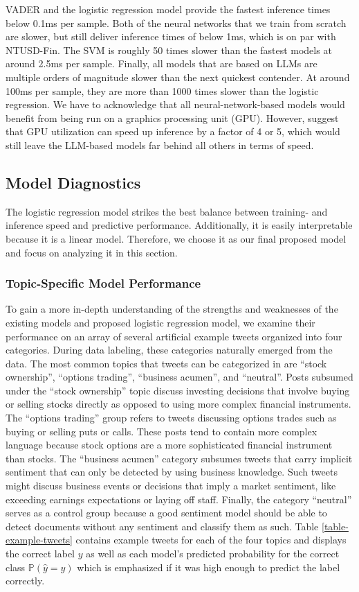 VADER and the logistic regression model provide the fastest inference times below 0.1ms per sample. Both of the neural networks that we train from scratch are slower, but still deliver inference times of below 1ms, which is on par with NTUSD-Fin. The SVM is roughly 50 times slower than the fastest models at around 2.5ms per sample. Finally, all models that are based on LLMs are multiple orders of magnitude slower than the next quickest contender. At around 100ms per sample, they are more than 1000 times slower than the logistic regression. We have to acknowledge that all neural-network-based models would benefit from being run on a graphics processing unit (GPU). However,  suggest that GPU utilization can speed up inference by a factor of 4 or 5, which would still leave the LLM-based models far behind all others in terms of speed.

\subsection{Model Diagnostics}
The logistic regression model strikes the best balance between training- and inference speed and predictive performance. Additionally, it is easily interpretable because it is a linear model. Therefore, we choose it as our final proposed model and focus on analyzing it in this section.

\subsubsection{Topic-Specific Model Performance}
To gain a more in-depth understanding of the strengths and weaknesses of the existing models and proposed logistic regression model, we examine their performance on an array of several artificial example tweets organized into four categories. During data labeling, these categories naturally emerged from the data. The most common topics that tweets can be categorized in are ``stock ownership'', ``options trading'', ``business acumen'', and ``neutral''. Posts subsumed under the ``stock ownership'' topic discuss investing decisions that involve buying or selling stocks directly as opposed to using more complex financial instruments. The ``options trading'' group refers to tweets discussing options trades such as buying or selling puts or calls. These posts tend to contain more complex language because stock options are a more sophisticated financial instrument than stocks. The ``business acumen'' category subsumes tweets that carry implicit sentiment that can only be detected by using business knowledge. Such tweets might discuss business events or decisions that imply a market sentiment, like exceeding earnings expectations or laying off staff. Finally, the category ``neutral'' serves as a control group because a good sentiment model should be able to detect documents without any sentiment and classify them as such. Table \ref{table-example-tweets} contains example tweets for each of the four topics and displays the correct label ${y}$ as well as each model's predicted probability for the correct class ${\mathbb{P}(\hat y = y)}$ which is emphasized if it was high enough to predict the label correctly.


